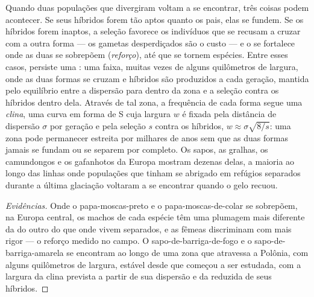 \begin{proposition}\label{prop:b2:speciation:reinforcement}
Quando duas populações que divergiram voltam a se encontrar, três coisas
podem acontecer. Se seus híbridos forem tão aptos quanto os pais, elas
se fundem. Se os híbridos forem inaptos, a seleção favorece os
indivíduos que se recusam a cruzar com a outra forma --- os gametas
desperdiçados são o custo --- e o  se fortalece
onde as duas se sobrepõem (\emph{reforço}), até que se tornem espécies.
Entre esses casos, persiste uma \emph{}: uma faixa, muitas
vezes de alguns quilômetros de largura, onde as duas formas se cruzam e
híbridos são produzidos a cada geração, mantida pelo equilíbrio entre a
dispersão para dentro da zona e a seleção contra os híbridos dentro
dela. Através de tal zona, a frequência de cada forma segue uma
\emph{clina}, uma curva em forma de S cuja largura $w$ é fixada pela
distância de dispersão $\sigma$ por geração e pela seleção $s$ contra os
híbridos, $w \approx
\sigma\sqrt{8/s}$: uma zona pode permanecer estreita por milhares de
anos sem que as duas formas jamais se fundam ou se separem por completo.
Os sapos, as gralhas, os camundongos e os gafanhotos da Europa mostram
dezenas delas, a maioria ao longo das linhas onde populações que tinham
se abrigado em refúgios separados durante a última glaciação voltaram a
se encontrar quando o gelo recuou.
\end{proposition}
\begin{proof}[Evidências]
Onde o papa-moscas-preto e o papa-moscas-de-colar se sobrepõem, na
Europa central, os machos de cada espécie têm uma plumagem mais
diferente da do outro do que onde vivem separados, e as fêmeas
discriminam com mais rigor --- o reforço medido no campo. O
sapo-de-barriga-de-fogo e o sapo-de-barriga-amarela se encontram ao longo de uma
zona que atravessa a Polônia, com alguns quilômetros de largura, estável
desde que começou a ser estudada, com a largura da clina prevista a
partir de sua dispersão e da  reduzida de seus híbridos.
\end{proof}

